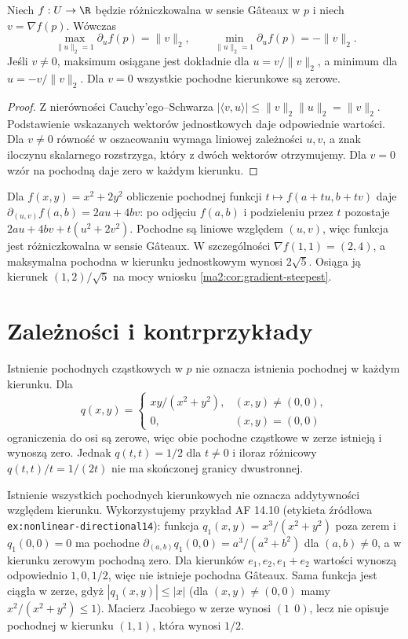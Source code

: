 \begin{wniosek}
\label{ma2:cor:gradient-steepest}
Niech $f:U\to\R$ będzie różniczkowalna w sensie
Gâteaux w $p$ i niech $v=\nabla f(p)$.
Wówczas
\[
 \max_{\|u\|_2=1}\partial_u f(p)=\|v\|_2,\qquad
 \min_{\|u\|_2=1}\partial_u f(p)=-\|v\|_2.
\]
Jeśli $v\ne0$, maksimum osiągane jest dokładnie dla
$u=v/\|v\|_2$, a minimum dla $u=-v/\|v\|_2$.
Dla $v=0$ wszystkie pochodne kierunkowe są zerowe.
\end{wniosek}
\begin{proof}
Z nierówności Cauchy'ego--Schwarza
$|\langle v,u\rangle|\le\|v\|_2\|u\|_2=\|v\|_2$.
Podstawienie wskazanych wektorów jednostkowych daje
odpowiednie wartości. Dla $v\ne0$ równość w oszacowaniu
wymaga liniowej zależności $u,v$, a znak iloczynu
skalarnego rozstrzyga, który z dwóch wektorów otrzymujemy.
Dla $v=0$ wzór na pochodną daje zero w każdym kierunku.
\end{proof}

\begin{przyklad}
Dla $f(x,y)=x^2+2y^2$ obliczenie pochodnej funkcji
$t\mapsto f(a+tu,b+tv)$ daje
$\partial_{(u,v)}f(a,b)=2au+4bv$: po odjęciu
$f(a,b)$ i podzieleniu przez $t$ pozostaje
$2au+4bv+t(u^2+2v^2)$.
Pochodne są liniowe względem $(u,v)$, więc funkcja
jest różniczkowalna w sensie Gâteaux.
W szczególności $\nabla f(1,1)=(2,4)$, a maksymalna
pochodna w kierunku jednostkowym wynosi $2\sqrt5$.
Osiąga ją kierunek $(1,2)/\sqrt5$ na mocy wniosku
\ref{ma2:cor:gradient-steepest}.
\end{przyklad}

\section{Zależności i kontrprzykłady}

Istnienie pochodnych cząstkowych w $p$ nie oznacza
istnienia pochodnej w każdym kierunku. Dla
\[
 q(x,y)=
 \begin{cases}
 xy/(x^2+y^2),&(x,y)\ne(0,0),\\
 0,&(x,y)=(0,0)
 \end{cases}
\]
ograniczenia do osi są zerowe, więc obie pochodne
cząstkowe w zerze istnieją i wynoszą zero. Jednak
$q(t,t)=1/2$ dla $t\ne0$ i iloraz różnicowy
$q(t,t)/t=1/(2t)$ nie ma skończonej granicy dwustronnej.

Istnienie wszystkich pochodnych kierunkowych nie
oznacza addytywności względem kierunku. Wykorzystujemy
przykład AF 14.10 (etykieta źródłowa
\texttt{ex:nonlinear-directional14}): funkcja
$q_1(x,y)=x^3/(x^2+y^2)$ poza zerem i $q_1(0,0)=0$
ma pochodne
$\partial_{(a,b)}q_1(0,0)=a^3/(a^2+b^2)$
dla $(a,b)\ne0$, a w kierunku zerowym pochodną zero.
Dla kierunków $e_1,e_2,e_1+e_2$ wartości wynoszą
odpowiednio $1,0,1/2$, więc nie istnieje pochodna
Gâteaux. Sama funkcja jest ciągła w zerze, gdyż
$|q_1(x,y)|\le |x|$ (dla $(x,y)\ne(0,0)$
mamy $x^2/(x^2+y^2)\le1$).
Macierz Jacobiego w zerze wynosi $(1\ \ 0)$, lecz
nie opisuje pochodnej w kierunku $(1,1)$, która
wynosi $1/2$.

